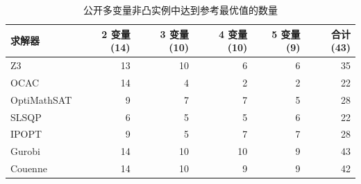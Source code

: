 \begin{table}[H]
\centering
\caption{公开多变量非凸实例中达到参考最优值的数量}
\label{tab:exp-nra-public}
\small
\setlength{\tabcolsep}{6pt}
\begin{tabular}{@{}lrrrrr@{}}
\toprule
求解器 & 2 变量 (14) & 3 变量 (10) & 4 变量 (10) & 5 变量 (9) & 合计 (43) \\
\midrule
Z3 & 13 & 10 & 6 & 6 & 35 \\
OCAC & 14 & 4 & 2 & 2 & 22 \\
OptiMathSAT & 9 & 7 & 7 & 5 & 28 \\
\midrule
SLSQP & 6 & 5 & 5 & 6 & 22 \\
IPOPT & 9 & 5 & 7 & 7 & 28 \\
Gurobi & 14 & 10 & 10 & 9 & 43 \\
Couenne & 14 & 10 & 9 & 9 & 42 \\
\bottomrule
\end{tabular}
\end{table}
